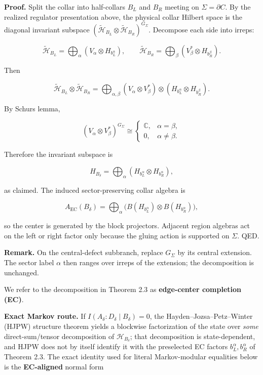 \textbf{Proof.} Split the collar into half-collars \(B_L\) and \(B_R\) meeting on \(\Sigma = \partial C\). By the realized regulator presentation above, the physical collar Hilbert space is the diagonal invariant subspace \((\tilde{\mathcal H}_{B_L} \otimes \tilde{\mathcal H}_{B_R})^{G_\Sigma}\). Decompose each side into irreps:

\[
\tilde{\mathcal H}_{B_L} = \bigoplus_\alpha (V_\alpha \otimes H_{b_L^\alpha}),\qquad
\tilde{\mathcal H}_{B_R} = \bigoplus_\beta (V_\beta^* \otimes H_{b_R^\beta}).
\]

Then

\[
\tilde{\mathcal H}_{B_L} \otimes \tilde{\mathcal H}_{B_R}
= \bigoplus_{\alpha,\beta}
(V_\alpha \otimes V_\beta^*) \otimes
(H_{b_L^\alpha} \otimes H_{b_R^\beta}).
\]

By Schur\textquotesingle s lemma,

\[
(V_\alpha \otimes V_\beta^*)^{G_\Sigma}
\cong
\begin{cases}
\mathbb C, & \alpha=\beta,\\
0, & \alpha\ne\beta.
\end{cases}
\]

Therefore the invariant subspace is

\[
H_{B_\delta} = \bigoplus_\alpha (H_{b_L^\alpha} \otimes H_{b_R^\alpha}),
\]

as claimed. The induced sector-preserving collar algebra is

\[
A_{\mathrm{EC}}(B_\delta) = \bigoplus_\alpha
\bigl(B(H_{b_L^\alpha}) \otimes B(H_{b_R^\alpha})\bigr),
\]

so the center is generated by the block projectors. Adjacent region algebras act on the left or right factor only because the gluing action is supported on \(\Sigma\). QED.

\textbf{Remark.} On the central-defect subbranch, replace \(G_\Sigma\) by its central extension. The sector label \(\alpha\) then ranges over irreps of the extension; the decomposition is unchanged.

We refer to the decomposition in Theorem 2.3 as \textbf{edge-center completion (EC)}.

\textbf{Exact Markov route.} If \(I(A_\delta:D_\delta\mid B_\delta)=0\), the Hayden--Jozsa--Petz--Winter (HJPW) structure theorem yields a blockwise factorization of the state over \emph{some} direct-sum/tensor decomposition of \(\mathcal H_{B_\delta}\); that decomposition is state-dependent, and HJPW does not by itself identify it with the preselected EC factors \(b_L^\alpha,b_R^\alpha\) of Theorem 2.3. The exact identity used for literal Markov-modular equalities below is the \textbf{EC-aligned} normal form

